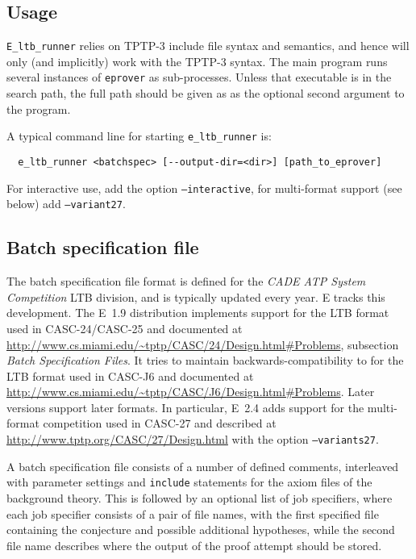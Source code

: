 \documentclass{report}
\begin{document}
\subsection{Usage}

\texttt{E\_ltb\_runner} relies on TPTP-3 include file syntax and
semantics, and hence will only (and implicitly) work with the TPTP-3
syntax. The main program runs several instances of \texttt{eprover} as
sub-processes. Unless that executable is in the search path, the full
path should be given as as the optional second argument to the
program.

A typical command line for starting \texttt{e\_ltb\_runner} is:

\begin{verbatim}
  e_ltb_runner <batchspec> [--output-dir=<dir>] [path_to_eprover]
\end{verbatim}

For interactive use, add the option \texttt{--interactive}, for
multi-format support (see below) add \texttt{--variant27}.


\subsection{Batch specification file}
\label{sec:bsf}

The batch specification file format is defined for the \emph{CADE ATP
  System Competition} LTB division, and is typically updated every
year. E tracks this development. The E~1.9 distribution implements
support for the LTB format used in CASC-24/CASC-25 and documented at
\url{http://www.cs.miami.edu/~tptp/CASC/24/Design.html#Problems},
subsection \emph{Batch Specification Files}. It tries to maintain
backwards-compatibility to for the LTB format used in CASC-J6 and
documented at
\url{http://www.cs.miami.edu/~tptp/CASC/J6/Design.html#Problems}. Later
versions support later formats. In particular, E~2.4 adds support for
the multi-format competition used in CASC-27 and described at
\url{http://www.tptp.org/CASC/27/Design.html} with the option
\texttt{--variants27}.

A batch specification file consists of a number of defined comments,
interleaved with parameter settings and \texttt{include} statements
for the axiom files of the background theory. This is followed by an
optional list of job specifiers, where each job specifier consists of
a pair of file names, with the first specified file containing the
conjecture and possible additional hypotheses, while the second file
name describes where the output of the proof attempt should be stored.
\end{document}
